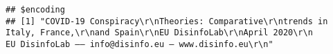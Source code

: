 \documentclass[
]{book}
\begin{document}
\begin{verbatim}
## $encoding
## [1] "COVID-19 Conspiracy\r\nTheories: Comparative\r\ntrends in Italy, France,\r\nand Spain\r\nEU DisinfoLab\r\nApril 2020\r\n              EU DisinfoLab –– info@disinfo.eu – www.disinfo.eu\r\n"                                                                                                                                                                                                                                                                                                                                                                                                                                                                                                                                                                                                                                                                                                                                                                                                                                                                                                                                                                                                                                                                                                                                                                                                                                                                                                                                                                                                                                                                                                                                                                                                                                                                                                                                                                                                                                                                                                                                                                                                                                                                                                                                                                                                                                                                                                                                                                                                                                                                                                                                                                                                                                                                                                                                                                                                                                                                                                                                                                                                                                                                                                                                                                      
\end{verbatim}
\end{document}
